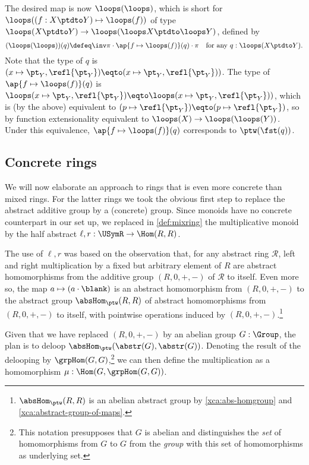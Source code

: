 {\begin{remark}
The desired map is now $\loops(\loops)$, which is short for
$\loops((f:X\ptdto Y) \mapsto \loops(f))$ of type $\loops(X\ptdto Y) \to \loops(\loops X\ptdto \loops Y)$, defined by
\[
(\loops(\loops))(q)\defeq\inv\pi\cdot\ap{f\mapsto\loops(f)}(q)\cdot\pi
\quad\text{for any $q:\loops(X\ptdto Y)$}.
\]
Note that the type of $q$ is 
$(x\mapsto\pt_Y,\refl{\pt_Y})\eqto(x\mapsto\pt_Y,\refl{\pt_Y}))$.
The type of $\ap{f\mapsto\loops(f)}(q)$ is
$\loops(x\mapsto\pt_Y,\refl{\pt_Y})\eqto\loops(x\mapsto\pt_Y,\refl{\pt_Y}))$,
which is (by the above) equivalent to 
$(p\mapsto \refl{\pt_Y})\eqto(p\mapsto \refl{\pt_Y})$,
so by function extensionality equivalent to 
$\loops(X)\to\loops(\loops(Y))$. Under this equivalence,
$\ap{f\mapsto\loops(f)}(q)$ corresponds to $\ptw(\fst(q))$. 
\end{remark}

}%


\subsection{Concrete rings}\label{sec:concrings}

We will now elaborate an approach to rings that is even more concrete
than mixed rings. For the latter rings we took the
obvious first step to replace the abstract additive group by a 
(concrete) group. Since monoids have no concrete counterpart in our set up,
we replaced in \cref{def:mixring} the multiplicative monoid 
by the half abstract $\ell,r:\USymR\to\Hom(R,R)$.

The use of $\ell,r$ was based on the observation that, 
for any abstract ring $\mathscr R$, left and right multiplication
by a fixed but arbitrary element of $R$ are 
abstract homomorphisms from the additive group $(R,0,+,-)$ of 
$\mathscr R$ to itself. 
Even more so, the map $a\mapsto(a\cdot\blank)$ is an abstract homomorphism
from $(R,0,+,-)$ to the abstract group $\absHom_{\ptw}(R,R)$
of abstract homomorphisms from $(R,0,+,-)$ to itself, with
pointwise operations induced by $(R,0,+,-)$.\footnote{%
$\absHom_{\ptw}(R,R)$ is an abelian abstract group by
\cref{xca:abs-homgroup} and \cref{xca:abstract-group-of-maps}.}

Given that we have replaced $(R,0,+,-)$ by an abelian group $G:\Group$,
the plan is to deloop $\absHom_{\ptw}(\abstr(G),\abstr(G))$. 
Denoting the result of the delooping by $\grpHom(G,G)$,\footnote{%
This notation presupposes that $G$ is abelian and distinguishes 
the \emph{set} of homomorphisms from $G$ to $G$ from the \emph{group}
with this set of homomorphisms as underlying set.}
we can then define the multiplication as a homomorphism
$\mu: \Hom(G,\grpHom(G,G))$.

